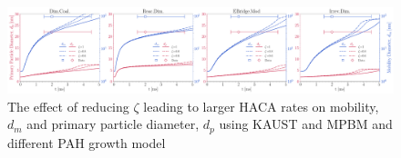 \begin{figure}[H]
	\centering
	\includegraphics[width=1\textwidth]{Figures/Results/Shocktube/Stanford/TEM/dp_dm_zetaeffect.pdf}
	\caption{The effect of reducing $\zeta$ leading to larger HACA rates on mobility, $d_m$ and primary particle diameter, $d_p$ using KAUST and MPBM and different PAH growth model}
	\label{fig:shocktube_ddd_zetseffect} 
\end{figure}